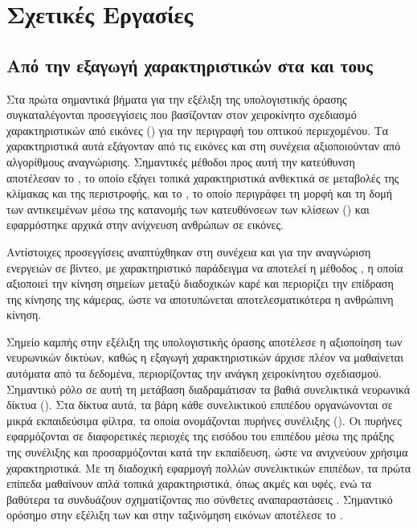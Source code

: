 \chapter{Σχετικές Εργασίες}
\label{ch:sota}


\section{Από την εξαγωγή χαρακτηριστικών στα  και τους
}
\label{sec:related-cnn-vt}

Στα πρώτα σημαντικά βήματα για την εξέλιξη της υπολογιστικής όρασης
συγκαταλέγονται προσεγγίσεις που βασίζονταν στον χειροκίνητο σχεδιασμό
χαρακτηριστικών από εικόνες () για την περιγραφή του οπτικού
περιεχομένου. Τα χαρακτηριστικά αυτά εξάγονταν από τις εικόνες και στη
συνέχεια αξιοποιούνταν από αλγορίθμους αναγνώρισης. Σημαντικές μέθοδοι
προς αυτή την κατεύθυνση αποτέλεσαν το
\cite{lowe2004distinctive}, το οποίο εξάγει τοπικά χαρακτηριστικά
ανθεκτικά σε μεταβολές της κλίμακας και της περιστροφής, και το
\cite{dalal2005histograms}, το οποίο περιγράφει τη μορφή και τη δομή των
αντικειμένων μέσω της κατανομής των κατευθύνσεων των κλίσεων
() και εφαρμόστηκε αρχικά στην ανίχνευση ανθρώπων σε εικόνες.

Αντίστοιχες προσεγγίσεις αναπτύχθηκαν στη συνέχεια και για την αναγνώριση
ενεργειών σε βίντεο, με χαρακτηριστικό παράδειγμα να αποτελεί η μέθοδος
 \cite{wang2013action}, η οποία αξιοποιεί
την κίνηση σημείων μεταξύ διαδοχικών καρέ και περιορίζει την επίδραση της
κίνησης της κάμερας, ώστε να αποτυπώνεται αποτελεσματικότερα η ανθρώπινη κίνηση.

Σημείο καμπής στην εξέλιξη της υπολογιστικής όρασης αποτέλεσε η αξιοποίηση
των νευρωνικών δικτύων, καθώς η εξαγωγή χαρακτηριστικών άρχισε πλέον να
μαθαίνεται αυτόματα από τα δεδομένα, περιορίζοντας την ανάγκη χειροκίνητου
σχεδιασμού. Σημαντικό ρόλο σε αυτή τη μετάβαση διαδραμάτισαν τα βαθιά
συνελικτικά νευρωνικά δίκτυα
(). Στα δίκτυα αυτά, τα βάρη κάθε συνελικτικού επιπέδου οργανώνονται σε
μικρά εκπαιδεύσιμα φίλτρα, τα οποία ονομάζονται πυρήνες συνέλιξης
(). Οι πυρήνες εφαρμόζονται σε διαφορετικές περιοχές της
εισόδου του επιπέδου μέσω της πράξης της συνέλιξης και προσαρμόζονται
κατά την εκπαίδευση, ώστε να ανιχνεύουν χρήσιμα χαρακτηριστικά. Με τη
διαδοχική εφαρμογή πολλών συνελικτικών επιπέδων, τα πρώτα επίπεδα
μαθαίνουν απλά τοπικά χαρακτηριστικά, όπως ακμές και υφές, ενώ τα
βαθύτερα τα συνδυάζουν σχηματίζοντας πιο σύνθετες αναπαραστάσεις
\cite{goodfellow2016deep}. Σημαντικό ορόσημο στην εξέλιξη των
 και στην ταξινόμηση εικόνων αποτέλεσε το 
\cite{krizhevsky2012imagenet}.

